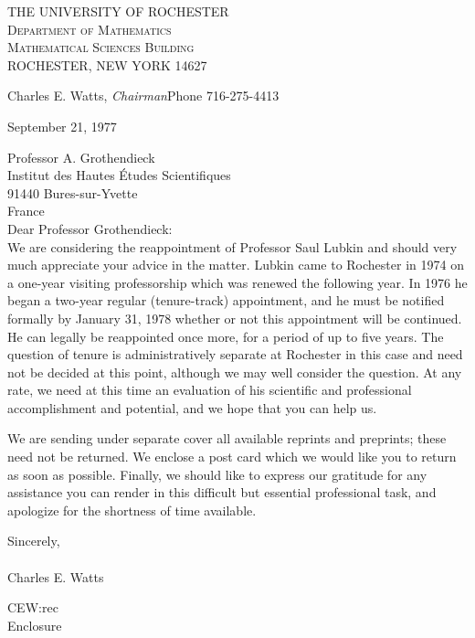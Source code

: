 \begin{center}
THE UNIVERSITY OF ROCHESTER\\
\textsc{Department of Mathematics}\\
\textsc{Mathematical Sciences Building}\\
ROCHESTER, NEW YORK 14627
\end{center}
Charles E. Watts, \textit{Chairman}\hfill Phone 716-275-4413\\

\begin{flushright}
September 21, 1977\\
\end{flushright}

Professor A. Grothendieck\\
Institut des Hautes Études Scientifiques\\
91440 Bures-sur-Yvette\\
France\\

Dear Professor Grothendieck:\\

We are considering the reappointment of Professor Saul Lubkin and should very much appreciate your advice in the matter. Lubkin came to Rochester in 1974 on a one-year visiting professorship which was renewed the following year. In 1976 he began a two-year regular (tenure-track) appointment, and he must be notified formally by January 31, 1978 whether or not this appointment will be continued. He can legally be reappointed once more, for a period of up to five years. The question of tenure is administratively separate at Rochester in this case and need not be decided at this point, although we may well consider the question. At any rate, we need at this time an evaluation of his scientific and professional accomplishment and potential, and we hope that you can help us.

We are sending under separate cover all available reprints and preprints; these need not be returned. We enclose a post card which we would like you to return as soon as possible. Finally, we should like to express our gratitude for any assistance you can render in this difficult but essential professional task, and apologize for the shortness of time available.

\begin{flushright}
Sincerely,\\
\\
Charles E. Watts\\
\end{flushright}

CEW:rec\\

Enclosure
